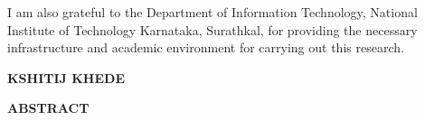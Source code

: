 \documentclass[12pt,a4paper]{report}
\begin{document}
\vspace{4mm}
\noindent
I am also grateful to the Department of Information Technology, National Institute of Technology Karnataka, Surathkal, for providing the necessary infrastructure and academic environment for carrying out this research.

\vspace{25mm}
\begin{flushright}
    \textbf{KSHITIJ KHEDE}
\end{flushright}
\clearpage

\setcounter{page}{1}

\begin{center}
    {\Large\bfseries ABSTRACT}
\end{center}
\vspace{2mm}
\end{document}
